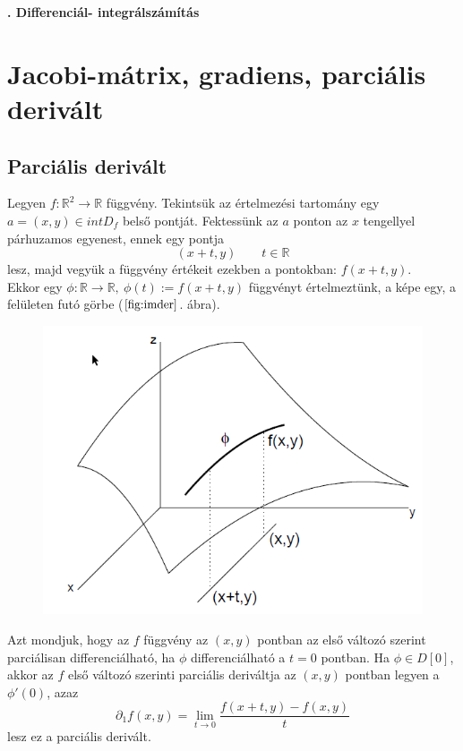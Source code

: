 \documentclass[12pt,margin=0px]{article}
\newcommand\ddfrac[2]{\frac{\displaystyle #1}{\displaystyle #2}}
\begin{document}
    \thispagestyle{fancy}
    {\Large\bfseries{}. Differenciál- integrálszámítás} \\
	
	\section*{Jacobi-mátrix, gradiens, parciális derivált}

    \subsection*{Parciális derivált}

    \noindent Legyen $f: \mathbb{R}^2 \to \mathbb{R}$ függvény. Tekintsük az értelmezési tartomány egy $a = (x, y) \in int D_f$ belső pontját. Fektessünk az $a$ ponton az $x$ tengellyel párhuzamos egyenest, ennek egy pontja
    \[
        (x + t, y) \qquad t \in \mathbb{R}
    \]
    lesz, majd vegyük a függvény értékeit ezekben a pontokban: $f(x + t, y)$. \\

    \noindent Ekkor egy $\phi: \mathbb{R} \to \mathbb{R},\ \phi(t) := f(x + t, y)$ függvényt értelmeztünk, a képe egy, a felületen futó görbe ($\ref{fig:imder}$. ábra).

    \begin{figure}[H]
        \centering
        \includegraphics[width=0.6\linewidth]{img/imderv.png}
        \caption{}
        \label{fig:imder}
    \end{figure}

    \noindent Azt mondjuk, hogy az $f$ függvény az $(x,y)$ pontban az első változó szerint parciálisan differenciálható, ha $\phi$ differenciálható a $t = 0$ pontban. Ha $\phi \in D[0]$, akkor az $f$ első változó szerinti parciális deriváltja az $(x,y)$ pontban legyen a $\phi'(0)$, azaz
    \[
        \partial_{1}f(x,y) = \lim\limits_{t \to 0}\ddfrac{f(x + t, y) - f(x,y)}{t}
    \]
    lesz ez a parciális derivált.\\
\end{document}
